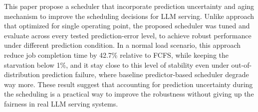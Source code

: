 This paper propose a scheduler that incorporate prediction uncertainty and aging mechanism to improve the scheduling decisions for LLM serving. Unlike approach that optimized for single operating point, the proposed scheduler was tuned and evaluate across every tested prediction-error level, to achieve robust performance under different prediction condition. In a normal load scenario, this approach reduce job completion time by 42.7\% relative to FCFS, while keeping the starvation below 1\%, and it stay close to this level of stability even under out-of-distribution prediction failure, where baseline predictor-based scheduler degrade way more. These result suggest that accounting for prediction uncertainty during the scheduling is a practical way to improve the robustness without giving up the fairness in real LLM serving systems.